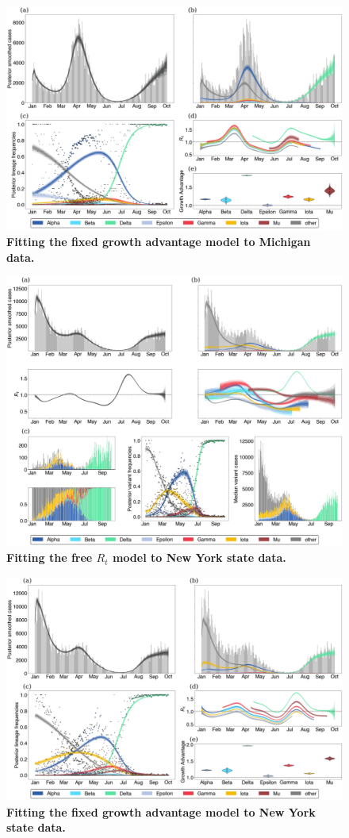 \documentclass[11pt,oneside,letterpaper]{article}
\begin{document}
\begin{figure}
  \centering
  \includegraphics[width=\linewidth]{figs/fixed_growth_Michigan.png}
  \caption{\textbf{Fitting the fixed growth advantage model to Michigan data.}}%
  \label{fig:fixed_growth_Michigan}
\end{figure}


\begin{figure}
  \centering
  \includegraphics[width=\linewidth]{figs/free_rt_New-York.png}
  \caption{\textbf{Fitting the free $R_{t}$ model to New York state data.}}%
  \label{fig:free_rt_New-York}
\end{figure}

\begin{figure}
  \centering
  \includegraphics[width=\linewidth]{figs/fixed_growth_New-York.png}
  \caption{\textbf{Fitting the fixed growth advantage model to New York state data.}}%
  \label{fig:fixed_growth_New-York}
\end{figure}
\end{document}
